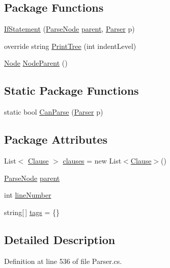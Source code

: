 \subsection*{Package Functions}
\begin{DoxyCompactItemize}
\item 
\hyperlink{a00112_ae534078389e8663edf7660403acf3cbc}{If\-Statement} (\hyperlink{a00142}{Parse\-Node} \hyperlink{a00142_af313a82103fcc2ff5a177dbb06b92f7b}{parent}, \hyperlink{a00143}{Parser} p)
\item 
override string \hyperlink{a00112_a5494c1daef8e0f3ac3ab68f91db4f332}{Print\-Tree} (int indent\-Level)
\item 
\hyperlink{a00132}{Node} \hyperlink{a00142_a580e520a29444fc23ac3660cbe514a09}{Node\-Parent} ()
\end{DoxyCompactItemize}
\subsection*{Static Package Functions}
\begin{DoxyCompactItemize}
\item 
static bool \hyperlink{a00112_afd6b96e1a27872701c4e6832f17fc3ce}{Can\-Parse} (\hyperlink{a00143}{Parser} p)
\end{DoxyCompactItemize}
\subsection*{Package Attributes}
\begin{DoxyCompactItemize}
\item 
List$<$ \hyperlink{a00044}{Clause} $>$ \hyperlink{a00112_a679b1a21582c78ed06df36bccc9c3cbc}{clauses} = new List$<$\hyperlink{a00044}{Clause}$>$()
\item 
\hyperlink{a00142}{Parse\-Node} \hyperlink{a00142_af313a82103fcc2ff5a177dbb06b92f7b}{parent}
\item 
int \hyperlink{a00142_a18b493382de0fde5b4299c1bd2250075}{line\-Number}
\item 
string\mbox{[}$\,$\mbox{]} \hyperlink{a00142_a58b3a15788fd2d4127d73619dc6d04ae}{tags} = \{\}
\end{DoxyCompactItemize}


\subsection{Detailed Description}


Definition at line 536 of file Parser.\-cs.



